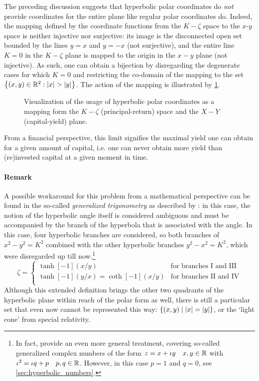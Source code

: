 The preceding discussion suggests that hyperbolic polar coordinates do \emph{not} provide coordinates for the entire plane like regular polar coordinates do. Indeed, the mapping defined by the coordinate functions from the \(K-\zeta\) space to the \(x\)-\(y\) space is neither injective nor surjective: its image is the disconnected open set bounded by the lines \(y = x\) and \(y = -x\) (not surjective), and the entire line \(K = 0\) in the \(K-\zeta\) plane is mapped to the origin in the \(x-y\) plane (not injective). As such, one can obtain a bijection by disregarding the degenerate cases for which \(K = 0\) and restricting the co-domain of the mapping to the set \(\qty{(x, y) \in \real^2: \abs{x} > \abs{y}}\). The action of the mapping is illustrated by \cref{fig:polar_coords}.
\begin{figure}[ht]
    \centering
    
    \caption{Visualization of the usage of hyperbolic polar coordinates as a mapping form the $K-\zeta$ (principal-return) space and the $X-Y$ (capital-yield) plane.}
    \label{fig:polar_coords}
\end{figure}
From a financial perspective, this limit signifies the maximal yield one can obtain for a given amount of capital, i.e. one can never obtain more yield than (re)invested capital at a given moment in time.

\paragraph{Remark} A possible workaround for this problem from a mathematical perspective can be found in the so-called \emph{generalized trigonometry} as described by \citet{Harkin2004}: in this case, the notion of the hyperbolic angle itself is considered ambiguous and must be accompanied by the branch of the hyperbola that is associated with the angle. In this case, four hyperbolic branches are considered, so both branches of \(x^2 - y^2 = K^2\) combined with the other hyperbolic branches \(y^2 - x^2 = K^2\), which were disregarded up till now.\footnote{In fact, \citeauthor{Harkin2004} provide an even more general treatment, covering so-called generalized complex numbers of the form \(z = x + \iota y\quad x, y \in \mathbb{R}\) with \(\iota^2 = \iota q + p\quad p, q \in \mathbb{R}\). However, in this case \(p = 1\) and \(q = 0\), see \cref{sec:hyperbolic_numbers}.}
\begin{equation}
    \zeta = 
    \begin{cases}
        \tanh[-1](x/y) & \text{for branches I and III}\\
        \tanh[-1](y/x) = \coth[-1](x/y) & \text{for branches II and IV}\\
    \end{cases}
\end{equation}
Although this extended definition brings the other two quadrants of the hyperbolic plane within reach of the polar form as well, there is still a particular set that even now cannot be represented this way: \(\qty{(x, y)\mid \abs{x} = \abs{y}}\), or the `light cone' from special relativity.

